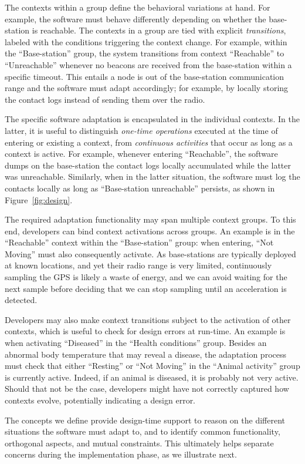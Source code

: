 The contexts within a group define the behavioral variations at
hand. For example, the software must behave differently depending on
whether the base-station is reachable.  The contexts in a group are
tied with explicit \emph{transitions}, labeled with the conditions
triggering the context change. For example, within the
``Base-station'' group, the system transitions from context
``Reachable'' to ``Unreachable'' whenever no beacons are received from
the base-station within a specific timeout. This entails a node is out
of the base-station communication range and the software must adapt
accordingly; for example, by locally storing the contact logs instead
of sending them over the radio.

The specific software adaptation is encapsulated in the individual
contexts. In the latter, it is useful to distinguish \emph{one-time
operations} executed at the time of entering or existing a context,
from \emph{continuous activities} that occur as long as a context is
active. For example, whenever entering ``Reachable'', the software
dumps on the base-station the contact logs locally accumulated while
the latter was unreachable. Similarly, when in the latter situation, the
software must log the contacts locally as long as ``Base-station
unreachable'' persists, as shown in Figure~\ref{fig:design}.

The required adaptation functionality may span multiple context
groups. To this end, developers can bind context activations across
groups. An example is in the ``Reachable'' context within the
``Base-station'' group: when entering, ``Not Moving'' must also
consequently activate. As base-stations are typically deployed at
known locations, and yet their radio range is very limited,
continuously sampling the GPS is likely a waste of energy, and we can
avoid waiting for the next sample before deciding that we can stop
sampling until an acceleration is detected.

Developers may also make context transitions subject to the activation
of other contexts, which is useful to check for design errors at
run-time. An example is when activating ``Diseased'' in the ``Health
conditions'' group. Besides an abnormal body temperature that may
reveal a disease, the adaptation process must check that either
``Resting'' or ``Not Moving'' in the ``Animal activity'' group is
currently active. Indeed, if an animal is diseased, it is probably not
very active. Should that not be the case, developers might have not
correctly captured how contexts evolve, potentially indicating a
design error.

The concepts we define provide design-time support to reason on the
different situations the software must adapt to, and to identify common
functionality, orthogonal aspects, and mutual constraints. This
ultimately helps separate concerns during the implementation phase, as
we illustrate next.



